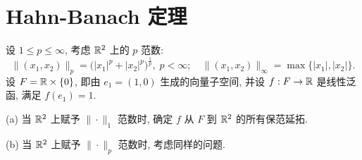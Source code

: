 \setcounter{chapter}{7}
\chapter{Hahn-Banach 定理}
\thispagestyle{empty}



\begin{exercise}
    设 $1\leq p\leq\infty$, 考虑 $\mathbb{R}^2$ 上的 $p$ 范数:
    \[\|(x_1,x_2)\|_p=\bigl(|x_1|^p+|x_2|^p\bigr)^{\frac{1}{p}},\;p<\infty;\quad \|(x_1,x_2)\|_{\infty}=\max\{|x_1|,|x_2|\}.\]
    设 $F=\mathbb{R}\times\{0\}$, 即由 $e_1=(1,0)$ 生成的向量子空间, 并设 $f:F\to\mathbb{R}$
    是线性泛函, 满足 $f(e_1)=1$.

    (a) 当 $\mathbb{R}^2$ 上赋予 $\|\cdot\|_1$ 范数时, 确定 $f$ 从 $F$ 到 $\mathbb{R}^2$ 的所有保范延拓.

    (b) 当 $\mathbb{R}^2$ 上赋予 $\|\cdot\|_p$ 范数时, 考虑同样的问题.
\end{exercise}

